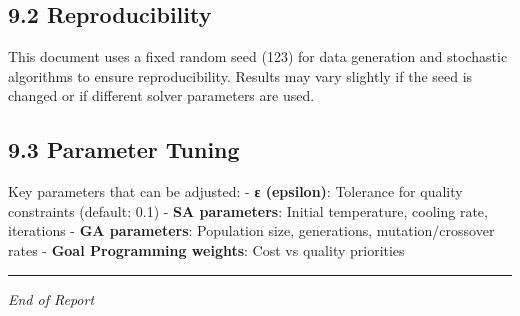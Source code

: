 \documentclass[
]{article}
\begin{document}
\subsection{9.2 Reproducibility}\label{reproducibility}

This document uses a fixed random seed (123) for data generation and
stochastic algorithms to ensure reproducibility. Results may vary
slightly if the seed is changed or if different solver parameters are
used.

\subsection{9.3 Parameter Tuning}\label{parameter-tuning}

Key parameters that can be adjusted: - \textbf{ε (epsilon)}: Tolerance
for quality constraints (default: 0.1) - \textbf{SA parameters}: Initial
temperature, cooling rate, iterations - \textbf{GA parameters}:
Population size, generations, mutation/crossover rates - \textbf{Goal
Programming weights}: Cost vs quality priorities

\begin{center}\rule{0.5\linewidth}{0.5pt}\end{center}

\emph{End of Report}
\end{document}
